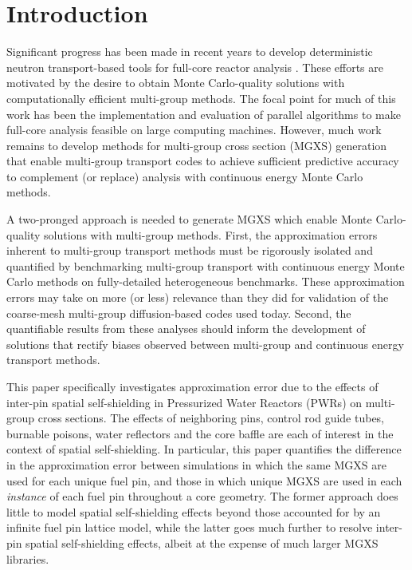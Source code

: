\section{Introduction}
\label{sec:intro}

Significant progress has been made in recent years to develop deterministic neutron transport-based tools for full-core reactor analysis \citep{gunow20173dmoc, ryu2015solution, kochunas2013overview, evans2010denovo, palmiotti2007unic}. These efforts are motivated by the desire to obtain Monte Carlo-quality solutions with computationally efficient multi-group methods. The focal point for much of this work has been the implementation and evaluation of parallel algorithms to make full-core analysis feasible on large computing machines. However, much work remains to develop methods for multi-group cross section (MGXS) generation that enable multi-group transport codes to achieve sufficient predictive accuracy to complement (or replace) analysis with continuous energy Monte Carlo methods.

A two-pronged approach is needed to generate MGXS which enable Monte Carlo-quality solutions with multi-group methods. First, the approximation errors inherent to multi-group transport methods must be rigorously isolated and quantified by benchmarking multi-group transport with continuous energy Monte Carlo methods on fully-detailed heterogeneous benchmarks. These approximation errors may take on more (or less) relevance than they did for validation of the coarse-mesh multi-group diffusion-based codes used today. Second, the quantifiable results from these analyses should inform the development of solutions that rectify biases observed between multi-group and continuous energy transport methods.

This paper specifically investigates approximation error due to the effects of inter-pin spatial self-shielding in Pressurized Water Reactors (PWRs) on multi-group cross sections. The effects of neighboring pins, control rod guide tubes, burnable poisons, water reflectors and the core baffle are each of interest in the context of spatial self-shielding. In particular, this paper quantifies the difference in the approximation error between simulations in which the same MGXS are used for each unique fuel pin, and those in which unique MGXS are used in each \textit{instance} of each fuel pin throughout a core geometry. The former approach does little to model spatial self-shielding effects beyond those accounted for by an infinite fuel pin lattice model, while the latter goes much further to resolve inter-pin spatial self-shielding effects, albeit at the expense of much larger MGXS libraries.

